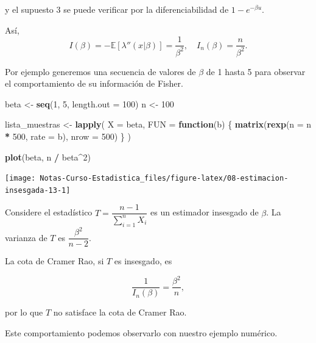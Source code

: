 \documentclass[
  12pt,
]{book}
\newenvironment{Shaded}{\begin{snugshade}}{\end{snugshade}}
\newcommand{\ControlFlowTok}[1]{\textcolor[rgb]{0.13,0.29,0.53}{\textbf{#1}}}
\newcommand{\DataTypeTok}[1]{\textcolor[rgb]{0.13,0.29,0.53}{#1}}
\newcommand{\DecValTok}[1]{\textcolor[rgb]{0.00,0.00,0.81}{#1}}
\newcommand{\KeywordTok}[1]{\textcolor[rgb]{0.13,0.29,0.53}{\textbf{#1}}}
\newcommand{\NormalTok}[1]{#1}
\newcommand{\OperatorTok}[1]{\textcolor[rgb]{0.81,0.36,0.00}{\textbf{#1}}}
\newcommand{\StringTok}[1]{\textcolor[rgb]{0.31,0.60,0.02}{#1}}
\begin{document}
y el supuesto 3 se puede verificar por la diferenciabilidad de \(1-e^{-\beta u}\).

Así,
\[I(\beta) = -\mathbb E[\lambda''(x|\beta)] = \dfrac 1{\beta^2}, \quad I_n(\beta) = \dfrac{n}{\beta^2}.\]

Por ejemplo generemos una secuencia de valores de \(\beta\) de 1 hasta 5 para
observar el comportamiento de su información de Fisher.

\begin{Shaded}
\begin{Highlighting}[]
\NormalTok{beta \textless{}{-}}\StringTok{ }\KeywordTok{seq}\NormalTok{(}\DecValTok{1}\NormalTok{, }\DecValTok{5}\NormalTok{, }\DataTypeTok{length.out =} \DecValTok{100}\NormalTok{)}
\NormalTok{n \textless{}{-}}\StringTok{ }\DecValTok{100}

\NormalTok{lista\_muestras \textless{}{-}}\StringTok{ }\KeywordTok{lapply}\NormalTok{(}
  \DataTypeTok{X =}\NormalTok{ beta,}
  \DataTypeTok{FUN =} \ControlFlowTok{function}\NormalTok{(b) \{}
    \KeywordTok{matrix}\NormalTok{(}\KeywordTok{rexp}\NormalTok{(}\DataTypeTok{n =}\NormalTok{ n }\OperatorTok{*}\StringTok{ }\DecValTok{500}\NormalTok{, }\DataTypeTok{rate =}\NormalTok{ b), }\DataTypeTok{nrow =} \DecValTok{500}\NormalTok{)}
\NormalTok{  \}}
\NormalTok{)}

\KeywordTok{plot}\NormalTok{(beta, n }\OperatorTok{/}\StringTok{ }\NormalTok{beta}\OperatorTok{\^{}}\DecValTok{2}\NormalTok{)}
\end{Highlighting}
\end{Shaded}

\begin{center}\texttt{[image: Notas-Curso-Estadistica\_files/figure-latex/08-estimacion-insesgada-13-1]} \end{center}

Considere el estadístico \(T = \dfrac{n-1}{\sum_{i=1}^n X_i}\) es un estimador insesgado de \(\beta\). La varianza de \(T\) es \(\dfrac{\beta^2}{n-2}\).

La cota de Cramer Rao, si \(T\) es insesgado, es

\[\dfrac 1{I_n(\beta)} = \dfrac{\beta^2}{n},\]

por lo que \(T\) no satisface la cota de Cramer Rao.

Este comportamiento podemos observarlo con nuestro ejemplo numérico.
\end{document}
